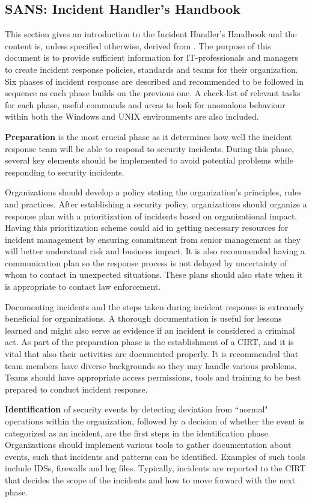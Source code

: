 \subsection{SANS: Incident Handler's Handbook}
This section gives an introduction to the Incident Handler's Handbook and the content is, unless specified otherwise, derived from \cite{SANShandbook}. The purpose of this document is to provide sufficient information for IT-professionals and managers to create incident response policies, standards and teams for their organization. Six phases of incident response are described and recommended to be followed in sequence as each phase builds on the previous one. A check-list of relevant tasks for each phase, useful commands and areas to look for anomalous behaviour within both the Windows and UNIX environments are also included.

\textbf{Preparation} is the most crucial phase as it determines how well the incident response team will be able to respond to security incidents. During this phase, several key elements should be implemented to avoid potential problems while responding to security incidents.

Organizations should develop a policy stating the organization's principles, rules and practices. After establishing a security policy, organizations should organize a response plan with a prioritization of incidents based on organizational impact. Having this prioritization scheme could aid in getting necessary resources for incident management by ensuring commitment from senior management as they will better understand risk and business impact. It is also recommended having a communication plan so the response process is not delayed by uncertainty of whom to contact in unexpected situations. These plans should also state when it is appropriate to contact law enforcement.

Documenting incidents and the steps taken during incident response is extremely beneficial for organizations. A thorough documentation is useful for lessons learned and might also serve as evidence if an incident is considered a criminal act. As part of the preparation phase is the establishment of a \ac{CIRT}, and it is vital that also their activities are documented properly. It is recommended that team members have diverse backgrounds so they may handle various problems. Teams should have appropriate access permissions, tools and training to be best prepared to conduct incident response.

\textbf{Identification} of security events by detecting deviation from ``normal" operations within the organization, followed by a decision of whether the event is categorized as an incident, are the first steps in the identification phase. Organizations should implement various tools to gather documentation about events, such that incidents and patterns can be identified. Examples of such tools include \acp{IDS}, firewalls and log files. Typically, incidents are reported to the \ac{CIRT} that decides the scope of the incidents and how to move forward with the next phase.

